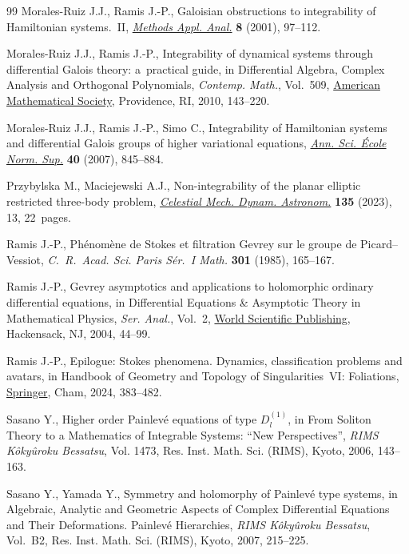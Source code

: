 \documentclass[10pt,a4paper]{amsart}
\numberwithin{equation}{section}
\begin{document}
\begin{thebibliography}{99}
Morales-Ruiz J.J., Ramis J.-P., Galoisian obstructions to integrability of
 {H}amiltonian systems.~{II}, \href{https://doi.org/10.4310/MAA.2001.v8.n1.a4}{\textit{Methods Appl. Anal.}} \textbf{8} (2001),
 97--112.

Morales-Ruiz J.J., Ramis J.-P., Integrability of dynamical systems through
 differential {G}alois theory: a~practical guide, in Differential Algebra,
 Complex Analysis and Orthogonal Polynomials, \textit{Contemp. Math.}, Vol.~509, \href{https://doi.org/10.1090/conm/509/09980}{American Mathematical Society}, Providence, RI, 2010, 143--220.

Morales-Ruiz J.J., Ramis J.-P., Simo C., Integrability of {H}amiltonian systems
 and differential {G}alois groups of higher variational equations,
 \href{https://doi.org/10.1016/j.ansens.2007.09.002}{\textit{Ann. Sci. \'{E}cole Norm. Sup.}} \textbf{40} (2007), 845--884.

Przybylska M., Maciejewski A.J., Non-integrability of the planar elliptic
 restricted three-body problem, \href{https://doi.org/10.1007/s10569-022-10120-5}{\textit{Celestial Mech. Dynam. Astronom.}}
 \textbf{135} (2023), 13, 22~pages.

Ramis J.-P., Ph\'enom\`ene de {S}tokes et filtration {G}evrey sur le groupe de
 {P}icard--{V}essiot, \textit{C.~R.~Acad. Sci. Paris S\'er.~{I} Math.}
 \textbf{301} (1985), 165--167.

Ramis J.-P., Gevrey asymptotics and applications to holomorphic ordinary
 differential equations, in Differential Equations \& Asymptotic Theory in
 Mathematical Physics, \textit{Ser. Anal.}, Vol.~2, \href{https://doi.org/10.1142/9789812702395_0002}{World Scientific
 Publishing}, Hackensack, NJ, 2004, 44--99.

Ramis J.-P., Epilogue: Stokes phenomena. Dynamics, classification problems and
 avatars, in Handbook of Geometry and Topology of Singularities~{VI}:
 Foliations, \href{https://doi.org/10.1007/978-3-031-54172-8_10}{Springer}, Cham, 2024, 383--482.

Sasano Y., Higher order {P}ainlev\'e equations of type {$D^{(1)}_l$}, in From
 Soliton Theory to a Mathematics of Integrable Systems: ``New Perspectives'',
 \textit{RIMS K\^oky\^uroku Bessatsu}, Vol. 1473, Res. Inst. Math. Sci.
 (RIMS), Kyoto, 2006, 143--163.

Sasano Y., Yamada Y., Symmetry and holomorphy of {P}ainlev\'e type systems, in
 Algebraic, Analytic and Geometric Aspects of Complex Differential Equations
 and Their Deformations. {P}ainlev\'e Hierarchies, \textit{RIMS K\^oky\^uroku
 Bessatsu}, Vol.~B2, Res. Inst. Math. Sci. (RIMS), Kyoto, 2007, 215--225.


\end{thebibliography}
\end{document}
